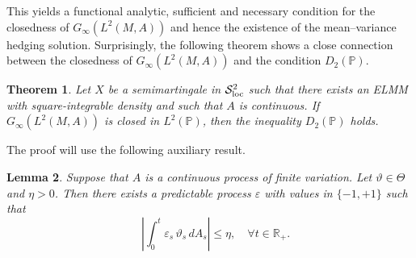 \documentclass[11pt,a4paper,twoside,openany]{report}
\numberwithin{equation}{section}
\theoremstyle{plain} %
\newtheorem{theorem}{Theorem}[section]
\newtheorem{lemma}[theorem]{Lemma}
\theoremstyle{definition} %
\theoremstyle{remark} %
\begin{document}
This yields a functional analytic, sufficient and necessary condition for the closedness of \(G_{\infty}(L^2(M,A))\) and hence the existence of the mean--variance hedging solution. Surprisingly, the following theorem shows a close connection between the closedness of \(G_{\infty}(L^2(M,A))\) and the condition \(D_2(\mathbb{P})\). 
\begin{theorem}\label{thm:G_T closed implies D_2(P)}
    Let \(X\) be a semimartingale in \(\mathcal{S}^2_{\rm{loc}}\) such that there exists an ELMM with square-integrable density and such that \(A\) is continuous.  If \(G_{\infty}(L^2(M,A))\) is closed in \(L^2(\mathbb{P})\), then the inequality \(D_2(\mathbb{P})\) holds. 
\end{theorem}
The proof will use the following auxiliary result.

\begin{lemma}\label{lemma:predictable epsilon}
Suppose that $A$ is a continuous process of finite variation. Let $\vartheta \in \Theta$ and $\eta>0$. Then there exists a predictable process $\varepsilon$ with values in $\{-1,+1\}$ such that
\begin{equation*}
    \quad \left|\int_0^t \varepsilon_s\,\vartheta_s\,dA_s\right|\le \eta,\quad\forall t\in\mathbb{R}_+.
\end{equation*}
\end{lemma}
\end{document}
